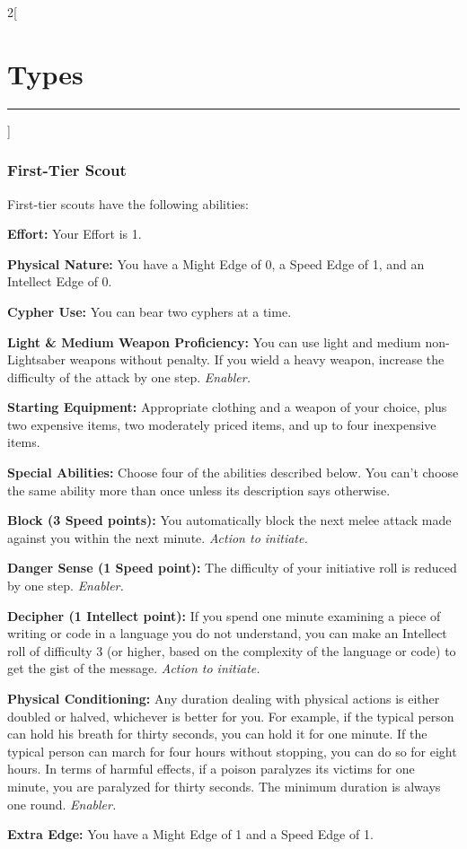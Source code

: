 \documentclass[a4paper,10pt,final]{book}
\newcommand{\HRule}{\rule{\linewidth}{0.5mm}} %
\newcommand{\newSection}[1]{\section*{#1} \addcontentsline{toc}{section}{#1} \label{sec:#1} \HRule}
\newcommand{\itemLine}[2]{\textbf{#1:} {#2}\par}
\newcommand{\itemAbility}[2]{\textcolor{25gray}{\textbullet\textbf{ #1:}} {#2}\par}
\newcommand{\enabler}{\textit{ Enabler.}}
\newcommand{\actionInit}{\textit{ Action to initiate.}}
\newenvironment{docsection}[1]
{
  \begin{multicols*}{2}[\newSection{#1}]
}
{
  \end{multicols*}
  \newpage
}
\begin{document}
\begin{docsection}{Types}

\subsubsection*{First-Tier Scout}
\label{subsub:scoutFirstTier}

First-tier scouts have the following abilities: \par

\itemLine{Effort}{Your Effort is 1.}

\itemLine{Physical Nature} {You have a Might Edge of 0, a Speed Edge of 1, and an Intellect Edge of 0.}

\itemLine{Cypher Use}{You can bear two cyphers at a time.}

\itemLine{Light \& Medium Weapon Proficiency} {You can use light and medium non-Lightsaber weapons without penalty. If you wield a heavy weapon, increase the difficulty of the attack by one step.\enabler}

\itemLine{Starting Equipment}{Appropriate clothing and a weapon of your choice, plus two expensive items, two moderately priced items, and up to four inexpensive items.}

\itemLine{Special Abilities}{Choose four of the abilities described below. You can’t choose the same ability more than once unless its description says otherwise.}

\itemAbility{Block (3 Speed points)}{You automatically block the next melee attack made against you within the next minute.\actionInit}

\itemAbility{Danger Sense (1 Speed point)}{The difficulty of your initiative roll is reduced by one step.\enabler}

\itemAbility{Decipher (1 Intellect point)}{If you spend one minute examining a piece of writing or code in a language you do not understand, you can make an Intellect roll of difficulty 3 (or higher, based on the complexity of the language or code) to get the gist of the message.\actionInit}

\itemAbility{Physical Conditioning}{Any duration dealing with physical actions is either doubled or halved, whichever is better for you. For example, if the typical person can hold his breath for thirty seconds, you can hold it for one minute. If the typical person can march for four hours without stopping, you can do so for eight hours. In terms of harmful effects, if a poison paralyzes its victims for one minute, you are paralyzed for thirty seconds. The minimum duration is always one round.\enabler} \itemAbility{Extra Edge}{You have a Might Edge of 1 and a Speed Edge of 1.}


\end{docsection}
\end{document}
